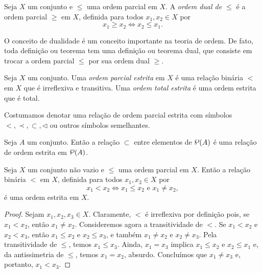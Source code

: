 \begin{definition}
	Seja $X$ um conjunto e $\leq$ uma ordem parcial em $X$. A \emph{ordem dual de $\leq$} é a ordem parcial $\geq$ em $X$, definida para todos $x_1,x_2 \in X$ por
	\begin{equation*}
	x_1 \geq x_2 \Leftrightarrow x_2 \leq x_1.
	\end{equation*}
\end{definition}

	O conceito de dualidade é um conceito importante na teoria de ordem. De fato, toda definição ou teorema tem uma definição ou teorema dual, que consiste em trocar a ordem parcial $\leq$ por sua ordem dual $\geq$.

\begin{definition}
	Seja $X$ um conjunto. Uma \emph{ordem parcial estrita} em $X$ é uma relação binária $<$ em $X$ que é irreflexiva e transitiva. Uma \emph{ordem total estrita} é uma ordem estrita que é total.
\end{definition}

	Costumamos denotar uma relação de ordem parcial estrita com símbolos $<, \prec, \subset, \lhd$ ou outros símbolos semelhantes.

\begin{example}
	Seja $A$ um conjunto. Então a relação $\subset$ entre elementos de $\p(A)$ é uma relação de ordem estrita em $\p(A)$.
\end{example}

\begin{proposition}
	Seja $X$ um conjunto não vazio e $\leq$ uma ordem parcial em $X$. Então a relação binária $<$ em $X$, definida para todos $x_1,x_2 \in X$ por
	\begin{equation*}
	x_1 < x_2 \Leftrightarrow x_1 \leq x_2 \text{\ \ e\ \ } x_1 \neq x_2,
	\end{equation*}
é uma ordem estrita em $X$.
\end{proposition}
\begin{proof}
	Sejam $x_1,x_2,x_3 \in X$. Claramente, $<$ é irreflexiva por definição pois, se $x_1 < x_2$, então $x_1 \neq x_2$. Consideremos agora a transitividade de $<$. Se $x_1 < x_2$ e $x_2 < x_3$, então $x_1 \leq x_2$ e $x_2 \leq x_3$, e também $x_1 \neq x_2$ e $x_2 \neq x_3$. Pela transitividade de $\leq$, temos $x_1 \leq x_3$. Ainda, $x_1=x_3$ implica $x_1 \leq x_2$ e $x_2 \leq x_1$ e, da antissimetria de $\leq$, temos $x_1 = x_2$, absurdo. Concluímos que $x_1 \neq x_3$ e, portanto, $x_1 < x_3$.
\end{proof}

